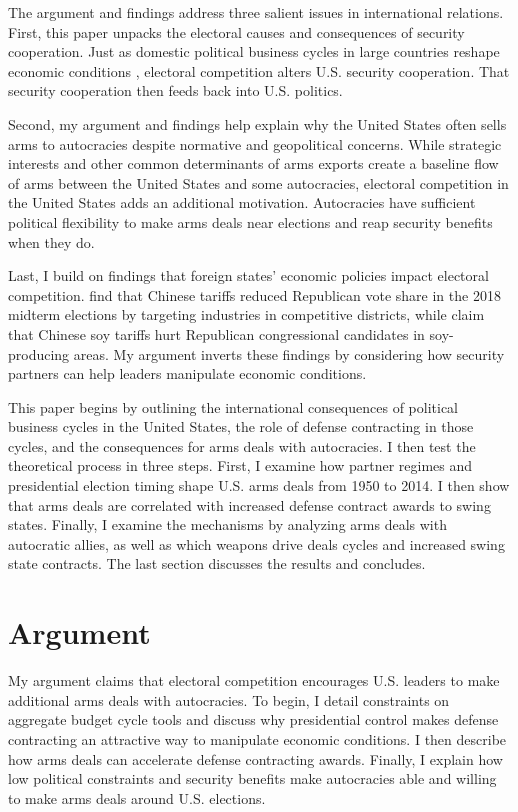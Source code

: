\documentclass[12pt]{article}
\begin{document}
The argument and findings address three salient issues in international relations. 
First, this paper unpacks the electoral causes and consequences of security cooperation. 
Just as domestic political business cycles in large countries reshape economic conditions \citep{Kayser2006}, electoral competition alters U.S. security cooperation. 
That security cooperation then feeds back into U.S. politics. 


Second, my argument and findings help explain why the United States often sells arms to autocracies despite normative and geopolitical concerns. 
While strategic interests and other common determinants of arms exports create a baseline flow of arms between the United States and some autocracies, electoral competition in the United States adds an additional motivation. 
Autocracies have sufficient political flexibility to make arms deals near elections and reap security benefits when they do. 


Last, I build on findings that foreign states' economic policies impact electoral competition. 
\citet{KimMargalit2021} find that Chinese tariffs reduced Republican vote share in the 2018 midterm elections by targeting industries in competitive districts, while \citet{ChyzhUrbatsch2021} claim that Chinese soy tariffs hurt Republican congressional candidates in soy-producing areas. 
My argument inverts these findings by considering how security partners can help leaders manipulate economic conditions. 


This paper begins by outlining the international consequences of political business cycles in the United States, the role of defense contracting in those cycles, and the consequences for arms deals with autocracies. 
I then test the theoretical process in three steps. 
First, I examine how partner regimes and presidential election timing shape U.S. arms deals from 1950 to 2014.
I then show that arms deals are correlated with increased defense contract awards to swing states.
Finally, I examine the mechanisms by analyzing arms deals with autocratic allies, as well as which weapons drive deals cycles and increased swing state contracts.
The last section discusses the results and concludes.


\section{Argument}


My argument claims that electoral competition encourages U.S. leaders to make additional arms deals with autocracies.
To begin, I detail constraints on aggregate budget cycle tools and discuss why presidential control makes defense contracting an attractive way to manipulate economic conditions.
I then describe how arms deals can accelerate defense contracting awards. 
Finally, I explain how low political constraints and security benefits make autocracies able and willing to make arms deals around U.S. elections.
\end{document}

